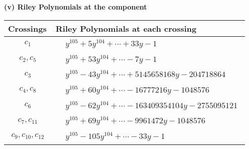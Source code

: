\documentclass[1p]{elsarticle_modified}
\theoremstyle{definition}
\begin{document}
\flushleft \textbf{(v) Riley Polynomials at the component}\newline \\
\begin{tabular}{m{50pt}|m{274pt}}
Crossings & \hspace{64pt}Riley Polynomials at each crossing \\
\hline $$\begin{aligned}c_{1}\end{aligned}$$&$\begin{aligned}
&y^{105}+5 y^{104}+\cdots+33 y-1
\end{aligned}$\\
\hline $$\begin{aligned}c_{2},c_{5}\end{aligned}$$&$\begin{aligned}
&y^{105}+53 y^{104}+\cdots-7 y-1
\end{aligned}$\\
\hline $$\begin{aligned}c_{3}\end{aligned}$$&$\begin{aligned}
&y^{105}-43 y^{104}+\cdots+5145658168 y-204718864
\end{aligned}$\\
\hline $$\begin{aligned}c_{4},c_{8}\end{aligned}$$&$\begin{aligned}
&y^{105}+60 y^{104}+\cdots-16777216 y-1048576
\end{aligned}$\\
\hline $$\begin{aligned}c_{6}\end{aligned}$$&$\begin{aligned}
&y^{105}-62 y^{104}+\cdots-163409354104 y-2755095121
\end{aligned}$\\
\hline $$\begin{aligned}c_{7},c_{11}\end{aligned}$$&$\begin{aligned}
&y^{105}+69 y^{104}+\cdots-9961472 y-1048576
\end{aligned}$\\
\hline $$\begin{aligned}c_{9},c_{10},c_{12}\end{aligned}$$&$\begin{aligned}
&y^{105}-105 y^{104}+\cdots-33 y-1
\end{aligned}$\\
\hline
\end{tabular}\\~\\
\end{document}
